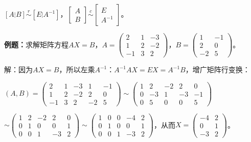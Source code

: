 \documentclass[UTF8, 12pt]{ctexart}
\begin{document}
$\left[A\vdots B\right]\overset{r}{\sim}\left[E\vdots A^{-1}\right]$，$\left[\begin{array}{c}
    A \\
    B
\end{array}\right]\overset{c}{\sim}\left[\begin{array}{c}
    E \\
    A^{-1}
\end{array}\right]$。

\textbf{例题：}求解矩阵方程$AX=B$，$A=\left(\begin{array}{ccc}
    2 & 1 & -3 \\
    1 & 2 & -2 \\
    -1 & 3 & 2
\end{array}\right)$，$B=\left(\begin{array}{cc}
    1 & -1 \\
    2 & 0 \\
    -2 & 5
\end{array}\right)$。\medskip

解：因为$AX=B$，所以左乘$A^{-1}$：$A^{-1}AX=EX=A^{-1}B$，增广矩阵行变换：

$(A,B)=\left(\begin{array}{ccccc}
    2 & 1 & -3 & 1 & -1 \\
    1 & 2 & -2 & 2 & 0 \\
    -1 & 3 & 2 & -2 & 5
\end{array}\right)\sim\left(\begin{array}{ccccc}
    1 & 2 & -2 & 2 & 0 \\
    0 & -3 & 1 & -3 & -1 \\
    0 & 5 & 0 & 0 & 5
\end{array}\right)$

$\sim\left(\begin{array}{ccccc}
    1 & 2 & -2 & 2 & 0 \\
    0 & 1 & 0 & 0 & 1 \\
    0 & 0 & 1 & -3 & 2
\end{array}\right)\sim\left(\begin{array}{ccccc}
    1 & 0 & 0 & -4 & 2 \\
    0 & 1 & 0 & 0 & 1 \\
    0 & 0 & 1 & -3 & 2
\end{array}\right)$，从而$X=\left(\begin{array}{cc}
    -4 & 2 \\
    0 & 1 \\
    -3 & 2
\end{array}\right)$。
\end{document}
